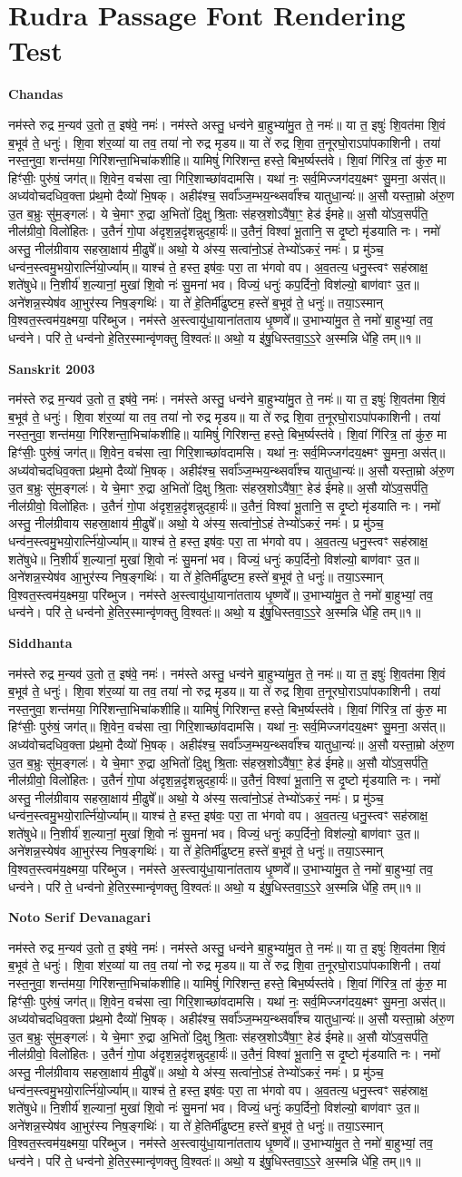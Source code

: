 \documentclass[11pt]{article}
\newcommand{\samplepassage}{नम॑स्ते रुद्र म॒न्यव॑ उ॒तो त॒ इष॑वे॒ नमः॑। नम॑स्ते अस्तु॒ धन्व॑ने बा॒हुभ्या॑मु॒त ते॒ नमः॑॥ या त॒ इषुः॑ शि॒वत॑मा शि॒वं ब॒भूव॑ ते॒ धनुः॑। शि॒वा श॑र॒व्या॑ या तव॒ तया॑ नो रुद्र मृडय॥ या ते॑ रुद्र शि॒वा त॒नूरघो॒राऽपा॑पकाशिनी। तया॑ नस्त॒नुवा॒ शन्त॑मया॒ गिरि॑शन्ता॒\-भिचा॑कशीहि॥ यामिषुं॑ गिरिशन्त॒ हस्ते॒ बिभ॒र्ष्यस्त॑वे। शि॒वां गि॑रित्र॒ तां कु॑रु॒ मा हिꣳ॑सीः॒ पुरु॑षं॒ जग॑त्॥ शि॒वेन॒ वच॑सा त्वा॒ गिरि॒शाच्छा॑वदामसि। यथा॑ नः॒ सर्व॒मिज्जग॑दय॒क्ष्मꣳ सु॒मना॒ अस॑त्॥ अध्य॑वोचदधिव॒क्ता प्र॑थ॒मो दैव्यो॑ भि॒षक्। अहीꣴ॑श्च॒ सर्वा᳚ञ्ज॒म्भय॒न्थ्सर्वा᳚श्च यातुधा॒न्यः॑॥ अ॒सौ यस्ता॒म्रो अ॑रु॒ण उ॒त ब॒भ्रुः सु॑म॒ङ्गलः॑। ये चे॒माꣳ रु॒द्रा अ॒भितो॑ दि॒क्षु श्रि॒ताः स॑हस्र॒शोऽवै॑षा॒ꣳ॒ हेड॑ ईमहे॥ अ॒सौ यो॑ऽव॒सर्प॑ति॒ नील॑ग्रीवो॒ विलो॑हितः। उ॒तैनं॑ गो॒पा अ॑दृश॒न्न॒दृ॑शन्नुदहा॒र्यः॑॥ उ॒तैनं॒ विश्वा॑ भू॒तानि॒ स दृ॒ष्टो मृ॑डयाति नः। नमो॑ अस्तु॒ नील॑ग्रीवाय सहस्रा॒क्षाय॑ मी॒ढुषे᳚॥ अथो॒ ये अ॑स्य॒ सत्वा॑नो॒ऽहं तेभ्यो॑ऽकरं॒ नमः॑। प्र मु॑ञ्च॒ धन्व॑न॒स्त्वमु॒भयो॒रार्त्नि॑यो॒र्ज्याम्॥ याश्च॑ ते॒ हस्त॒ इष॑वः॒ परा॒ ता भ॑गवो वप। अ॒व॒तत्य॒ धनु॒स्त्वꣳ सह॑स्राक्ष॒ शते॑षुधे॥ नि॒शीर्य॑ श॒ल्यानां॒ मुखा॑ शि॒वो नः॑ सु॒मना॑ भव। विज्यं॒ धनुः॑ कप॒र्दिनो॒ विश॑ल्यो॒ बाण॑वाꣳ उ॒त॥ अने॑शन्न॒\-स्येष॑व आ॒भुर॑स्य निष॒ङ्गथिः॑। या ते॑ हे॒तिर्मी॑ढुष्टम॒ हस्ते॑ ब॒भूव॑ ते॒ धनुः॑॥ तया॒ऽस्मान् वि॒श्वत॒स्त्वम॑य॒क्ष्मया॒ परि॑ब्भुज। नम॑स्ते अ॒स्त्वायु॑धा॒याना॑तताय धृ॒ष्णवे᳚॥ उ॒भाभ्या॑मु॒त ते॒ नमो॑ बा॒हुभ्यां॒ तव॒ धन्व॑ने। परि॑ ते॒ धन्व॑नो हे॒तिर॒स्मान्वृ॑णक्तु वि॒श्वतः॑॥ अथो॒ य इ॑षु॒धिस्तवा॒ऽ॒ऽ॒रे अ॒स्मन्नि धे॑हि॒ तम्॥१॥}
\begin{document}
\section*{Rudra Passage Font Rendering Test}

\textbf{Chandas}

{\chandasfont\fontsize{18}{26}\selectfont \samplepassage\par}

\newpage

\textbf{Sanskrit 2003}

{\sanskrittwokfont\fontsize{18}{26}\selectfont \samplepassage\par}

\newpage

\textbf{Siddhanta}

{\siddhantafont\fontsize{18}{26}\selectfont \samplepassage\par}

\newpage

\textbf{Noto Serif Devanagari}

{\notoserifdevanagarifont\fontsize{18}{26}\selectfont \samplepassage\par}
\end{document}
